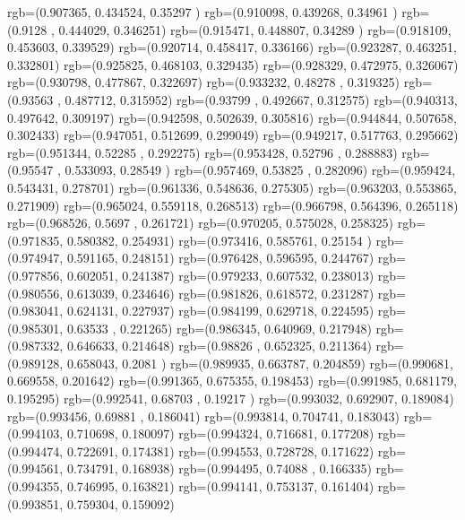 {{{      rgb=(0.907365,  0.434524,  0.35297 )
      rgb=(0.910098,  0.439268,  0.34961 )
      rgb=(0.9128  ,  0.444029,  0.346251)
      rgb=(0.915471,  0.448807,  0.34289 )
      rgb=(0.918109,  0.453603,  0.339529)
      rgb=(0.920714,  0.458417,  0.336166)
      rgb=(0.923287,  0.463251,  0.332801)
      rgb=(0.925825,  0.468103,  0.329435)
      rgb=(0.928329,  0.472975,  0.326067)
      rgb=(0.930798,  0.477867,  0.322697)
      rgb=(0.933232,  0.48278 ,  0.319325)
      rgb=(0.93563 ,  0.487712,  0.315952)
      rgb=(0.93799 ,  0.492667,  0.312575)
      rgb=(0.940313,  0.497642,  0.309197)
      rgb=(0.942598,  0.502639,  0.305816)
      rgb=(0.944844,  0.507658,  0.302433)
      rgb=(0.947051,  0.512699,  0.299049)
      rgb=(0.949217,  0.517763,  0.295662)
      rgb=(0.951344,  0.52285 ,  0.292275)
      rgb=(0.953428,  0.52796 ,  0.288883)
      rgb=(0.95547 ,  0.533093,  0.28549 )
      rgb=(0.957469,  0.53825 ,  0.282096)
      rgb=(0.959424,  0.543431,  0.278701)
      rgb=(0.961336,  0.548636,  0.275305)
      rgb=(0.963203,  0.553865,  0.271909)
      rgb=(0.965024,  0.559118,  0.268513)
      rgb=(0.966798,  0.564396,  0.265118)
      rgb=(0.968526,  0.5697  ,  0.261721)
      rgb=(0.970205,  0.575028,  0.258325)
      rgb=(0.971835,  0.580382,  0.254931)
      rgb=(0.973416,  0.585761,  0.25154 )
      rgb=(0.974947,  0.591165,  0.248151)
      rgb=(0.976428,  0.596595,  0.244767)
      rgb=(0.977856,  0.602051,  0.241387)
      rgb=(0.979233,  0.607532,  0.238013)
      rgb=(0.980556,  0.613039,  0.234646)
      rgb=(0.981826,  0.618572,  0.231287)
      rgb=(0.983041,  0.624131,  0.227937)
      rgb=(0.984199,  0.629718,  0.224595)
      rgb=(0.985301,  0.63533 ,  0.221265)
      rgb=(0.986345,  0.640969,  0.217948)
      rgb=(0.987332,  0.646633,  0.214648)
      rgb=(0.98826 ,  0.652325,  0.211364)
      rgb=(0.989128,  0.658043,  0.2081  )
      rgb=(0.989935,  0.663787,  0.204859)
      rgb=(0.990681,  0.669558,  0.201642)
      rgb=(0.991365,  0.675355,  0.198453)
      rgb=(0.991985,  0.681179,  0.195295)
      rgb=(0.992541,  0.68703 ,  0.19217 )
      rgb=(0.993032,  0.692907,  0.189084)
      rgb=(0.993456,  0.69881 ,  0.186041)
      rgb=(0.993814,  0.704741,  0.183043)
      rgb=(0.994103,  0.710698,  0.180097)
      rgb=(0.994324,  0.716681,  0.177208)
      rgb=(0.994474,  0.722691,  0.174381)
      rgb=(0.994553,  0.728728,  0.171622)
      rgb=(0.994561,  0.734791,  0.168938)
      rgb=(0.994495,  0.74088 ,  0.166335)
      rgb=(0.994355,  0.746995,  0.163821)
      rgb=(0.994141,  0.753137,  0.161404)
      rgb=(0.993851,  0.759304,  0.159092)
}}}
